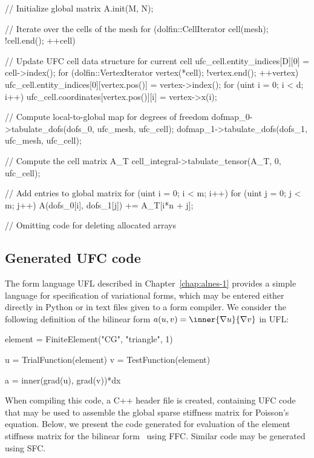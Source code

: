 \begin{c++}
{  // Initialize global matrix
  A.init(M, N);

  // Iterate over the cells of the mesh
  for (dolfin::CellIterator cell(mesh); !cell.end(); ++cell)
  {
    // Update UFC cell data structure for current cell
    ufc_cell.entity_indices[D][0] = cell->index();
    for (dolfin::VertexIterator vertex(*cell); !vertex.end(); ++vertex)
    {
      ufc_cell.entity_indices[0][vertex.pos()] = vertex->index();
      for (uint i = 0; i < d; i++)
        ufc_cell.coordinates[vertex.pos()][i] = vertex->x(i);
    }

    // Compute local-to-global map for degrees of freedom
    dofmap_0->tabulate_dofs(dofs_0, ufc_mesh, ufc_cell);
    dofmap_1->tabulate_dofs(dofs_1, ufc_mesh, ufc_cell);

    // Compute the cell matrix A_T
    cell_integral->tabulate_tensor(A_T, 0, ufc_cell);

    // Add entries to global matrix
    for (uint i = 0; i < m; i++)
      for (uint j = 0; j < m; j++)
        A(dofs_0[i], dofs_1[j]) += A_T[i*n + j];
  }

  // Omitting code for deleting allocated arrays
}
\end{c++}

\subsection{Generated UFC code}

The form language UFL described in Chapter~\ref{chap:alnes-1} provides
a simple language for specification of variational forms, which may be
entered either directly in Python or in text files given to a form
compiler.  We consider the following definition of the bilinear form
$a(u, v) = \inner{\nabla u}{\nabla v}$ in UFL:
\begin{c++}
element = FiniteElement("CG", "triangle", 1)

u = TrialFunction(element)
v = TestFunction(element)

a = inner(grad(u), grad(v))*dx
\end{c++}

When compiling this code, a C++ header file is created, containing UFC
code that may be used to assemble the global sparse stiffness matrix
for Poisson's equation. Below, we present the code generated for
evaluation of the element stiffness matrix for the bilinear
form~ using FFC. Similar code may be generated using SFC.

